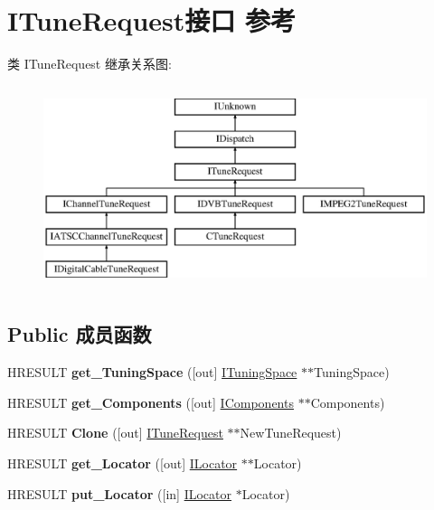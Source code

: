 \hypertarget{interface_i_tune_request}{}\section{I\+Tune\+Request接口 参考}
\label{interface_i_tune_request}
类 I\+Tune\+Request 继承关系图\+:\begin{figure}[H]
\begin{center}
\leavevmode
\includegraphics[height=6.000000cm]{interface_i_tune_request}
\end{center}
\end{figure}
\subsection*{Public 成员函数}
\begin{DoxyCompactItemize}
\item 
\mbox{\label{interface_i_tune_request_a13e71782db7a7fa431c47e97108712a8}} 
H\+R\+E\+S\+U\+LT {\bfseries get\+\_\+\+Tuning\+Space} (\mbox{[}out\mbox{]} \hyperlink{interface_i_tuning_space}{I\+Tuning\+Space} $\ast$$\ast$Tuning\+Space)
\item 
\mbox{\label{interface_i_tune_request_aaaecb6d3003ae05a6a933a0dd1bc5c7f}} 
H\+R\+E\+S\+U\+LT {\bfseries get\+\_\+\+Components} (\mbox{[}out\mbox{]} \hyperlink{interface_i_components}{I\+Components} $\ast$$\ast$Components)
\item 
\mbox{\label{interface_i_tune_request_a6eff9d5c0854672435b0d3b000f3e9d1}} 
H\+R\+E\+S\+U\+LT {\bfseries Clone} (\mbox{[}out\mbox{]} \hyperlink{interface_i_tune_request}{I\+Tune\+Request} $\ast$$\ast$New\+Tune\+Request)
\item 
\mbox{\label{interface_i_tune_request_a3844d33fe186f12777edcda18c226f1d}} 
H\+R\+E\+S\+U\+LT {\bfseries get\+\_\+\+Locator} (\mbox{[}out\mbox{]} \hyperlink{interface_i_locator}{I\+Locator} $\ast$$\ast$Locator)
\item 
\mbox{\label{interface_i_tune_request_a7be82735f0fbedc1b92e053e0fc7c64d}} 
H\+R\+E\+S\+U\+LT {\bfseries put\+\_\+\+Locator} (\mbox{[}in\mbox{]} \hyperlink{interface_i_locator}{I\+Locator} $\ast$Locator)
\end{DoxyCompactItemize}
